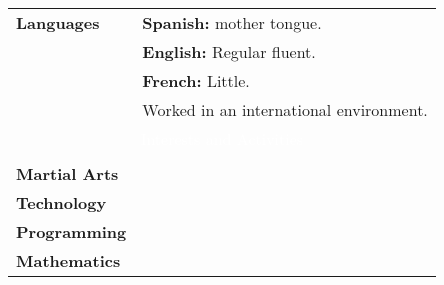 \documentclass[twoside,a4paper,openright,10pt]{report}
\begin{document}
\begin{table}[ht]
\begin{tabular}{p{40mm} p{140mm}}
\textbf{Languages} & \textbf{Spanish:} mother tongue.\\
& \textbf{English:} Regular fluent.\\
& \textbf{French:} Little.\\
& Worked in an international environment.

\\
\multicolumn{2}{c}{\cellcolor{black} \textcolor{white}{Interests and Activities}}\\ \\

\textbf{Martial Arts}\\
\textbf{Technology}\\
\textbf{Programming}\\
\textbf{Mathematics}

\end{tabular}
\end{table}
\end{document}
